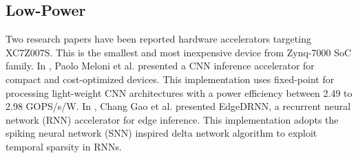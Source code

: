 \subsection{Low-Power}
Two research papers have been reported hardware accelerators targeting XC7Z007S. This is the smallest and most inexpensive device from Zynq-7000 SoC family. In \cite{meloni2019cnn}, Paolo Meloni et al. presented a CNN inference accelerator for compact and cost-optimized devices. This implementation uses fixed-point for processing light-weight CNN architectures with a power efficiency between 2.49 to 2.98 GOPS/s/W. In \cite{gao2020edgedrnn}, Chang Gao et al. presented EdgeDRNN, a recurrent neural network (RNN) accelerator for edge inference. This implementation adopts the spiking neural network (SNN) inspired delta network algorithm to exploit temporal sparsity in RNNs.
